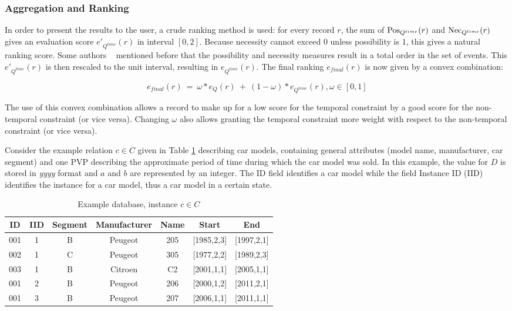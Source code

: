 \subsubsection{Aggregation and Ranking}
In order to present the results to the user, a crude ranking method is used: for every record $r$, the sum of $\operatorname{Pos}_{Q^{time}}(r)$ and $\operatorname{Nec}_{Q^{time}}(r)$ gives an evaluation score $e'_{Q^{time}}(r)$ in interval $\left[0,2\right]$. Because necessity cannot exceed $0$ unless possibility is $1$, this gives a natural ranking score. Some authors ~\cite{Bosc2010a} mentioned before that the possibility and necessity measures result in a total order in the set of events.  This $e'_{Q^{time}}(r)$ is then rescaled to the unit interval, resulting in $e_{Q^{time}}(r)$. The final ranking $e_{final}(r)$ is now given by a convex combination:


\begin{equation}
\label{eq:convex-comb}
e_{final}(r)\ =\ \omega*e_{Q}(r)\ +\ (1-\omega)*e_{Q^{time}}(r), \omega \in \left[0, 1 \right]
\end{equation}

The use of this convex combination allows a record to make up for a low score for the temporal constraint by a good score for the non-temporal constraint (or vice versa). Changing $\omega$ also allows granting the temporal constraint more weight with respect to the non-temporal constraint (or vice versa).

\begin{example} 
Consider the example relation $c \in C$ given in Table \ref{tb:car-models} describing car models, containing general attributes (model name, manufacturer, car segment) and one PVP  describing the approximate period of time during which the car model was sold. In this example, the value for $D$ is stored in \emph{yyyy} format and $a$ and $b$ are represented by an integer. The ID field identifies a car model while the field Instance ID (IID) identifies the instance for a car model, thus a car model in a certain state.
\end{example}


\begin{table}[h]
\centering
\caption{Example database, instance $c \in C$}
\vspace{2mm}
\begin{tabular}{c c c c c c c}
\hline
ID & IID & Segment & Manufacturer & Name & Start & End  \\ [0.5ex]
\hline
001 & 1 & B & Peugeot & 205 & [1985,2,3] & [1997,2,1] \\
002 & 1 & C & Peugeot & 305 & [1977,2,2] & [1989,2,3] \\
003 & 1 & B & Citroen & C2 & [2001,1,1] & [2005,1,1] \\
001 & 2 & B & Peugeot & 206 & [2000,1,2] & [2011,2,1] \\
001 & 3 & B & Peugeot & 207 & [2006,1,1] & [2011,1,1]\\
\hline
\end{tabular}
\label{tb:car-models}
\end{table}


